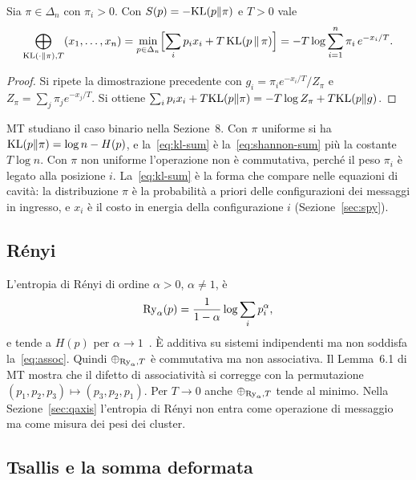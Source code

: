 \begin{proposizione}
\label{prop:kl}
Sia $\pi\in\Delta_n$ con $\pi_i>0$.
Con $S(p)=-\mathrm{KL}(p\|\pi)$ e $T>0$ vale
\begin{equation}
\bigoplus_{\mathrm{KL}(\cdot\|\pi),T}(x_1,\dots,x_n)=\min_{p\in\Delta_n}\Bigl[\sum_ip_ix_i+T\,\mathrm{KL}(p\,\|\,\pi)\Bigr]=-T\log\sum_{i=1}^n\pi_i\,e^{-x_i/T}.
\label{eq:kl-sum}
\end{equation}
\end{proposizione}

\begin{proof}
Si ripete la dimostrazione precedente con $g_i=\pi_ie^{-x_i/T}/Z_\pi$ e $Z_\pi=\sum_j\pi_je^{-x_j/T}$.
Si ottiene $\sum_ip_ix_i+T\mathrm{KL}(p\|\pi)=-T\log Z_\pi+T\mathrm{KL}(p\|g)$.
\end{proof}

MT studiano il caso binario nella Sezione~8.
Con $\pi$ uniforme si ha $\mathrm{KL}(p\|\pi)=\log n-H(p)$, e la~\eqref{eq:kl-sum} è la~\eqref{eq:shannon-sum} più la costante $T\log n$.
Con $\pi$ non uniforme l'operazione non è commutativa, perché il peso $\pi_i$ è legato alla posizione $i$.
La~\eqref{eq:kl-sum} è la forma che compare nelle equazioni di cavità: la distribuzione $\pi$ è la probabilità a priori delle configurazioni dei messaggi in ingresso, e $x_i$ è il costo in energia della configurazione $i$ (Sezione~\ref{sec:spy}).

\subsection{Rényi}

L'entropia di Rényi di ordine $\alpha>0$, $\alpha\ne1$, è
\begin{equation}
\mathrm{Ry}_\alpha(p)=\frac{1}{1-\alpha}\log\sum_ip_i^{\alpha},
\label{eq:renyi}
\end{equation}
e tende a $H(p)$ per $\alpha\to1$~\citep{renyi1961measures}.
È additiva su sistemi indipendenti ma non soddisfa la~\eqref{eq:assoc}.
Quindi $\oplus_{\mathrm{Ry}_\alpha,T}$ è commutativa ma non associativa.
Il Lemma~6.1 di MT mostra che il difetto di associatività si corregge con la permutazione $(p_1,p_2,p_3)\mapsto(p_3,p_2,p_1)$.
Per $T\to0$ anche $\oplus_{\mathrm{Ry}_\alpha,T}$ tende al minimo.
Nella Sezione~\ref{sec:qaxis} l'entropia di Rényi non entra come operazione di messaggio ma come misura dei pesi dei cluster.

\subsection{Tsallis e la somma deformata}

